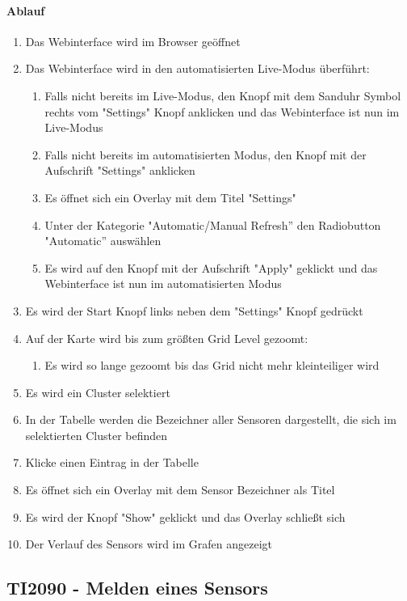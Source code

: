 \paragraph{Ablauf}
\begin{enumerate}
\item Das Webinterface wird im Browser geöffnet
\item Das Webinterface wird in den automatisierten Live-Modus überführt:
\begin{enumerate}
\item Falls nicht bereits im Live-Modus, den Knopf mit dem Sanduhr Symbol rechts vom "Settings" Knopf anklicken und das Webinterface ist nun im Live-Modus
\item Falls nicht bereits im automatisierten Modus, den Knopf mit der Aufschrift "Settings" anklicken
\item Es öffnet sich ein Overlay mit dem Titel "Settings"
\item Unter der Kategorie "Automatic/Manual Refresh'' den Radiobutton "Automatic'' auswählen
\item Es wird auf den Knopf mit der Aufschrift "Apply" geklickt und das Webinterface ist nun im automatisierten Modus
\end{enumerate} 
\item Es wird der Start Knopf links neben dem "Settings" Knopf gedrückt
\item Auf der Karte wird bis zum größten Grid Level gezoomt:
\begin{enumerate}
\item Es wird so lange gezoomt bis das Grid nicht mehr kleinteiliger wird
\end{enumerate}
\item Es wird ein Cluster selektiert
\item In der Tabelle werden die Bezeichner aller Sensoren dargestellt, die sich im selektierten Cluster befinden
\item Klicke einen Eintrag in der Tabelle
\item Es öffnet sich ein Overlay mit dem Sensor Bezeichner als Titel
\item Es wird der Knopf "Show" geklickt und das Overlay schließt sich
\item Der Verlauf des Sensors wird im Grafen angezeigt
\end{enumerate}
\szenarioGood

\subsection{TI2090 - Melden eines Sensors}

